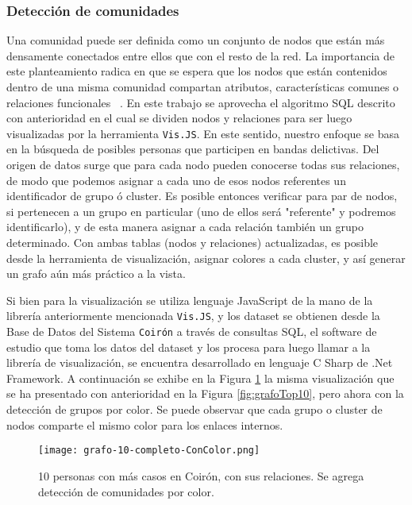 \vspace{-15pt}
\subsubsection{Detección de comunidades}
Una comunidad puede ser definida como un conjunto de nodos que están más densamente conectados entre ellos que con el resto de la red. La importancia de este planteamiento radica en que se espera que los nodos que están contenidos dentro de una misma comunidad compartan atributos, características comunes o relaciones funcionales  ~\cite{ma2014exploring}.
En este trabajo se aprovecha el algoritmo SQL descrito con anterioridad en el cual se dividen nodos y relaciones para ser luego visualizadas por la herramienta \texttt{Vis.JS}.
En este sentido, nuestro enfoque se basa en la búsqueda de posibles personas que participen en bandas delictivas. Del origen de datos surge que para cada nodo pueden conocerse todas sus relaciones, de modo que podemos asignar a cada uno de esos nodos referentes un identificador de grupo ó cluster. 
Es posible entonces verificar para par de nodos, si pertenecen a un grupo en particular (uno de ellos será "referente" y podremos identificarlo), y de esta manera asignar a cada relación también un grupo determinado. Con ambas tablas (nodos y relaciones) actualizadas, es posible desde la herramienta de visualización, asignar colores a cada cluster, y así generar un grafo aún más práctico a la vista.

Si bien para la visualización se utiliza lenguaje JavaScript de la mano de la librería anteriormente mencionada \texttt{Vis.JS}, y los dataset se obtienen desde la Base de Datos del Sistema \texttt{Coirón} a través de consultas SQL, el software de estudio que toma los datos del dataset y los procesa para luego llamar a la librería de visualización, se encuentra desarrollado en lenguaje C Sharp de .Net Framework. 
A continuación se exhibe en la Figura \ref{fig:grafo-10-completo-ConColor} la misma visualización que se ha presentado con anterioridad en la Figura \ref{fig:grafoTop10}, pero ahora con la detección de grupos por color. Se puede observar que cada grupo o cluster de nodos comparte el mismo color para los enlaces internos. 
\vspace{-10pt}
\begin{figure}
	\centering
	\texttt{[image: grafo-10-completo-ConColor.png]}
	\caption{10 personas con más casos en Coirón, con sus relaciones. Se agrega detección de comunidades por color.} 
	\label{fig:grafo-10-completo-ConColor}
\end{figure}
\vspace{-30pt}